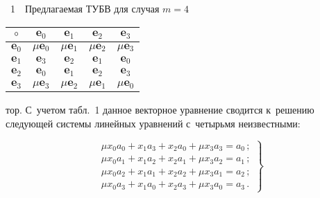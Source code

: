 \begin{multicols}{2}
\vspace*{9pt} %

\begin{center}
\noindent
\parbox{50mm}{{{\tablename~1}\ \ \small{Предлагаемая ТУБВ для случая $m = 4$}}}

\vspace*{8pt}

\tabcolsep=8pt
{\small
\begin{tabular}{|c|c|c|c|c|}
  \hline
\multicolumn{1}{|c|}{$\circ$}&\multicolumn{1}{c|}{$\mathbf{e}_0$}&$\mathbf{e}_1$&
$\mathbf{e}_2$&$\mathbf{e}_3$\\
\hline
$\mathbf{e}_0$&$\mu\mathbf{e}_0$&$\mu\mathbf{e}_1$&$\mu\mathbf{e}_2$&$\mu\mathbf{e}_3$\\
\hline
$\mathbf{e}_1$&$\mathbf{e}_3$&$\mathbf{e}_2$&$\mathbf{e}_1$&$\mathbf{e}_0$\\
\hline
$\mathbf{e}_2$&$\mathbf{e}_0$&$\mathbf{e}_1$&$\mathbf{e}_2$&$\mathbf{e}_3$\\
\hline
$\mathbf{e}_3$&$\mu\mathbf{e}_3$&$\mu\mathbf{e}_2$&$\mu\mathbf{e}_1$&$\mu\mathbf{e}_0$\\
\hline
\end{tabular}
}
\vspace*{2pt}
\end{center}






\noindent
тор. С~учетом табл.~1 данное векторное уравнение   сводится 
к~решению следующей системы линейных уравнений с~четырьмя 
неизвестными:

\vspace*{1pt}

\noindent
\begin{equation}
\left.
\begin{array}{l}
\mu x_0 a_0 +x_1a_3 +x_2a_0+\mu x_3a_3=a_0\,;\\[3pt]
\mu x_0 a_1+x_1a_2+x_2a_1+\mu x_3a_2=a_1\,;\\[3pt]
\mu x_0a_2+x_1a_1+x_2a_2+\mu x_3a_1=a_2\,;\\[3pt]
\mu x_0 a_3+x_1a_0 +x_2 a_3 +\mu x_3a_0=a_3\,.
\end{array}
\right\}
\label{e6-f}
\end{equation}

\vspace*{-1pt}


\end{multicols}
